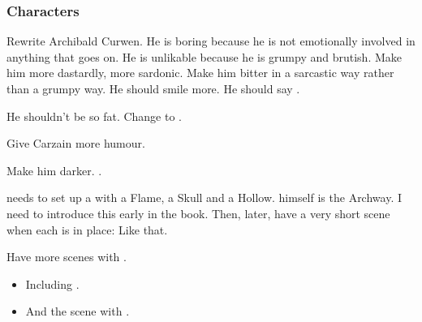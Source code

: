 \subsubsection{Characters}
\begin{changes}
  \begin{comment}\paragraph{Archibald Curwen}\end{comment}
    Rewrite Archibald Curwen. 
    He is boring because he is not emotionally involved in anything that goes on. 
    He is unlikable because he is grumpy and brutish. 
    Make him more dastardly, more sardonic. 
    Make him bitter in a sarcastic way rather than a grumpy way. 
    He should smile more. 
    He should say \quo{\Mister \Shireyo}. 
    
    He shouldn't be so fat. 
    Change  to . 
  
  \begin{comment}
  \paragraph{Carzain \Shachar}
  \end{comment}
    Give Carzain more humour.
  
  \begin{comment}
    \paragraph{\LocarPsyrex}
  \end{comment}
  \changesitem{\LocarPsyrex} 
    Make him darker.
    .
    
    \Psyrex needs to set up a  with a Flame, a Skull and a Hollow.
    \Psyrex himself is the Archway.
    I need to introduce this early in the book.
    Then, later, have a very short scene when each \vertex is in place: 
    Like that.
  
  \begin{comment}
  \paragraph{\MoroCobrel}
  \end{comment}
  \changesitem{\MoroCobrel} 
    Have more scenes with \MoroCobrel.
    \begin{itemize}
      \item 
        Including . 
      \item 
        And the scene with . 
    \end{itemize}
  

\end{changes}
